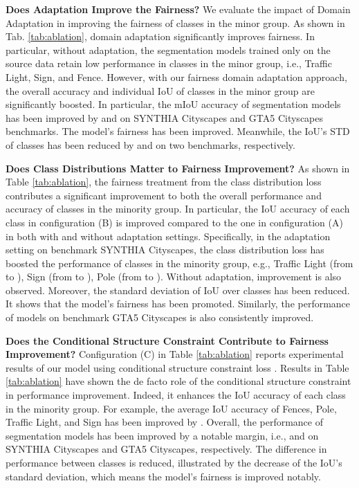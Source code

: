 \documentclass[10pt,twocolumn,letterpaper]{article}
\begin{document}
\noindent \textbf{Does Adaptation Improve the Fairness?} 
We evaluate the impact of Domain Adaptation in improving the fairness of classes in the minor group. As shown in Tab. \ref{tab:ablation}, domain adaptation significantly improves fairness. In particular, without adaptation, the segmentation models trained only on the source data retain low performance in classes in the minor group, i.e., Traffic Light, Sign, and Fence. However, with our fairness domain adaptation approach, the overall accuracy and individual IoU of classes in the minor group are significantly boosted. In particular, the mIoU accuracy of segmentation models has been improved by  and  on SYNTHIA  Cityscapes and GTA5  Cityscapes benchmarks. The model's fairness has been improved. Meanwhile, the IoU's STD of classes has been reduced by  and  on two benchmarks, respectively.

\noindent \textbf{Does Class Distributions Matter to Fairness Improvement?}
As shown in Table \ref{tab:ablation}, the fairness treatment from the class distribution loss  contributes a significant improvement to both the overall performance and accuracy of classes in the minority group. In particular,  the IoU accuracy of each class in configuration (B) is improved compared to the one in configuration (A) in both with and without adaptation settings. Specifically, in the adaptation setting on benchmark SYNTHIA  Cityscapes, the class distribution loss  has boosted the performance of classes in the minority group, e.g., Traffic Light (from  to ),  Sign (from  to ), Pole (from  to ).
Without adaptation, improvement is also observed. Moreover, the standard deviation of IoU over classes has been reduced. It shows that the model's fairness has been promoted. Similarly, the performance of models on benchmark GTA5  Cityscapes is also consistently improved. 

\noindent
\textbf{Does the Conditional Structure Constraint Contribute to Fairness Improvement?}
Configuration (C) in Table \ref{tab:ablation} reports experimental results of our model using conditional structure constraint loss . Results in Table \ref{tab:ablation} have shown the de facto role of the conditional structure constraint in performance improvement. Indeed, it enhances the IoU accuracy of each class in the minority group. For example, the average IoU accuracy of Fences, Pole, Traffic Light, and Sign has been improved by . Overall, the performance of segmentation models has been improved by a notable margin, i.e.,  and  on SYNTHIA  Cityscapes and GTA5  Cityscapes, respectively. The difference in performance between classes is reduced, illustrated by the decrease of the IoU's standard deviation, which means the model's fairness is improved notably.
\end{document}
